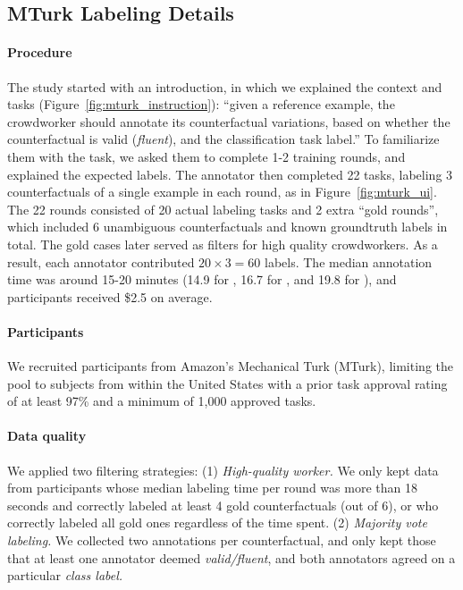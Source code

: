 \subsection{MTurk Labeling Details}
\label{appendix:label_instruct}


\paragraph{Procedure}
The study started with an introduction, in which we explained the context and tasks (Figure~\ref{fig:mturk_instruction}): 
``given a reference example, the crowdworker should annotate its counterfactual variations, based on whether the counterfactual is valid (\emph{fluent}), and the classification task label.''
To familiarize them with the task, we asked them to complete 1-2 training rounds, and explained the expected labels.
The annotator then completed 22 tasks, labeling 3 counterfactuals of a single example in each round, as in Figure~\ref{fig:mturk_ui}.
The 22 rounds consisted of 20 actual labeling tasks and 2 extra ``gold rounds'', which included 6 unambiguous counterfactuals and known groundtruth labels in total.
The gold cases later served as filters for high quality crowdworkers.
As a result, each annotator contributed $20 \times 3=60$ labels.
The median annotation time was around 15-20 minutes (14.9 for \qqp, 16.7 for \sst, and 19.8 for \nli), and participants received \$2.5 on average.

\paragraph{Participants}
We recruited participants from Amazon's Mechanical Turk (MTurk), limiting the pool to subjects from within the United States with a prior task approval rating of at least 97\% and a minimum of 1,000 approved tasks.

\paragraph{Data quality}
We applied two filtering strategies: 
(1) \emph{High-quality worker.} 
We only kept data from participants whose median labeling time per round was more than 18 seconds and correctly labeled at least 4 gold counterfactuals (out of 6), or who correctly labeled all gold ones regardless of the time spent.
(2) \emph{Majority vote labeling.}
We collected two annotations per counterfactual, and only kept those that at least one annotator deemed \emph{valid/fluent}, and both annotators agreed on a particular \emph{class label.}

